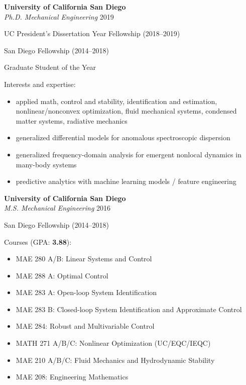 \documentclass[10pt]{article}
\newcommand{\blankline}{\quad\pagebreak[3]}
\begin{document}
\textbf{University of California San Diego} \\
\textit{Ph.D. Mechanical Engineering} \hfill 2019
\begin{innerlist}
    \item UC President's Dissertation Year Fellowship (2018--2019)
    \item San Diego Fellowship (2014--2018)
    \item Graduate Student of the Year
    \item Interests and expertise:
        \begin{itemize}
            \item applied math, control and stability, identification and estimation, nonlinear/nonconvex optimization, fluid mechanical systems, condensed matter systems, radiative mechanics
            \item generalized differential models for anomalous spectroscopic dispersion
            \item generalized frequency-domain analysis for emergent nonlocal dynamics in many-body systems
            \item predictive analytics with machine learning models / feature engineering
        \end{itemize}
\end{innerlist}

\blankline

\textbf{University of California San Diego} \\
\textit{M.S. Mechanical Engineering} \hfill 2016
\begin{innerlist}
    \item San Diego Fellowship (2014--2018)
    \item Courses (GPA: {\bf{3.88}}):
        \begin{itemize}
            \item MAE 280 A/B: Linear Systems and Control
            \item MAE 288 A: Optimal Control
            \item MAE 283 A: Open-loop System Identification
            \item MAE 283 B: Closed-loop System Identification and Approximate Control
            \item MAE 284: Robust and Multivariable Control
            \item MATH 271 A/B/C: Nonlinear Optimization (UC/EQC/IEQC)
            \item MAE 210 A/B/C: Fluid Mechanics and Hydrodynamic Stability
            \item MAE 208: Engineering Mathematics
        \end{itemize}
\end{innerlist}
\end{document}
